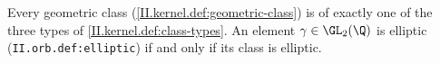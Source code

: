 Every geometric class (\cref{II.kernel.def:geometric-class}) is of exactly one of the three types of \cref{II.kernel.def:class-types}. An element
$\gamma\in\GL_2(\Q)$ is elliptic (\texttt{II.orb.def:elliptic}) if and only if its class is elliptic.
